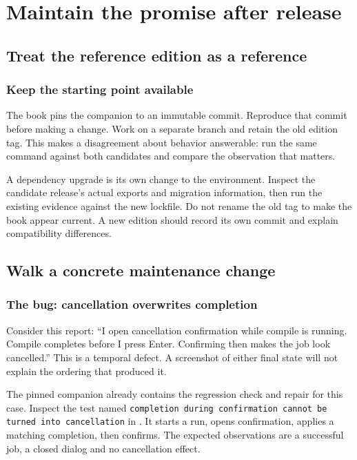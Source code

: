 \chapter{Maintain the promise after release}\label{teaching-maintenance}

\section{Treat the reference edition as a reference}
\subsection{Keep the starting point available}

The book pins the companion to an immutable commit. Reproduce that commit before making a change. Work on a separate branch and retain the old edition tag. This makes a disagreement about behavior answerable: run the same command against both candidates and compare the observation that matters.

A dependency upgrade is its own change to the environment. Inspect the candidate release's actual exports and migration information, then run the existing evidence against the new lockfile. Do not rename the old tag to make the book appear current. A new edition should record its own commit and explain compatibility differences.

\section{Walk a concrete maintenance change}
\subsection{The bug: cancellation overwrites completion}

Consider this report: ``I open cancellation confirmation while compile is running. Compile completes before I press Enter. Confirming then makes the job look cancelled.'' This is a temporal defect. A screenshot of either final state will not explain the ordering that produced it.

The pinned companion already contains the regression check and repair for this case. Inspect the test named \texttt{completion during confirmation cannot be turned into cancellation} in . It starts a run, opens confirmation, applies a matching completion, then confirms. The expected observations are a successful job, a closed dialog and no cancellation effect.

